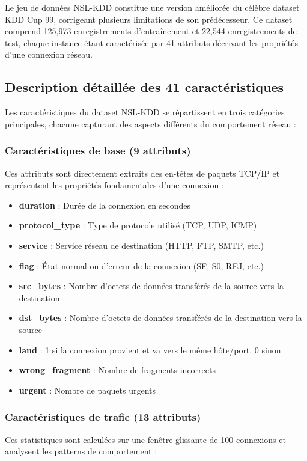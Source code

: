 Le jeu de données NSL-KDD constitue une version améliorée du célèbre dataset KDD Cup 99, corrigeant plusieurs limitations de son prédécesseur. Ce dataset comprend 125,973 enregistrements d'entraînement et 22,544 enregistrements de test, chaque instance étant caractérisée par 41 attributs décrivant les propriétés d'une connexion réseau.

\subsection{Description détaillée des 41 caractéristiques}

Les caractéristiques du dataset NSL-KDD se répartissent en trois catégories principales, chacune capturant des aspects différents du comportement réseau :

\subsubsection{Caractéristiques de base (9 attributs)}
Ces attributs sont directement extraits des en-têtes de paquets TCP/IP et représentent les propriétés fondamentales d'une connexion :

\begin{itemize}
    \item \textbf{duration} : Durée de la connexion en secondes
    \item \textbf{protocol\_type} : Type de protocole utilisé (TCP, UDP, ICMP)
    \item \textbf{service} : Service réseau de destination (HTTP, FTP, SMTP, etc.)
    \item \textbf{flag} : État normal ou d'erreur de la connexion (SF, S0, REJ, etc.)
    \item \textbf{src\_bytes} : Nombre d'octets de données transférés de la source vers la destination
    \item \textbf{dst\_bytes} : Nombre d'octets de données transférés de la destination vers la source
    \item \textbf{land} : 1 si la connexion provient et va vers le même hôte/port, 0 sinon
    \item \textbf{wrong\_fragment} : Nombre de fragments incorrects
    \item \textbf{urgent} : Nombre de paquets urgents
\end{itemize}

\subsubsection{Caractéristiques de trafic (13 attributs)}
Ces statistiques sont calculées sur une fenêtre glissante de 100 connexions et analysent les patterns de comportement :

